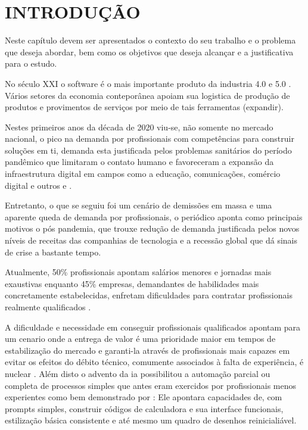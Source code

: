 


\section{\textbf{INTRODUÇÃO}}
    \label{sec:introdução}
    Neste capítulo devem ser apresentados o contexto do seu trabalho e o problema que
    deseja abordar, bem como os objetivos que deseja alcançar e a justificativa para o estudo.
    
    No século XXI o software é o mais importante produto da industria 4.0 e 5.0 .
    Vários setores da economia conteporânea apoiam sua logistica de produção de produtos e 
    provimentos de serviços por meio de tais ferramentas (expandir).

    Nestes primeiros anos da década de 2020 viu-se, não somente no
    mercado nacional, o pico na demanda por profissionais com
    competências para construir soluções em \ac{ti}, demanda esta justificada pelos
    problemas sanitários do período pandêmico que limitaram o contato humano e favoreceram a expansão
    da infraestrutura digital em campos como a educação, comunicações,
    comércio digital e outros \cite{vieira2024impactos} e \cite{carreira2023}.
    
    Entretanto, o que se seguiu foi um cenário de demissões em massa e uma aparente
    queda de demanda por profissionais, o periódico   aponta
    como principais motivos o pós pandemia, que trouxe redução de demanda justificada
    pelos novos níveis de receitas das companhias de tecnologia e a recessão global
    que dá sinais de crise a bastante tempo.

    Atualmente, 50\% profissionais apontam salários menores e
    jornadas mais exaustivas enquanto 45\% empresas, demandantes de habilidades mais
    concretamente estabelecidas, enfretam dificuldades para contratar profissionais
    realmente qualificados \cite{cnn2024}.

    A dificuldade e necessidade em conseguir profissionais qualificados apontam para
    um cenario onde a entrega de valor é uma prioridade maior em tempos de
    estabilização do mercado e garanti-la através de profissionais mais capazes
    em evitar os efeitos do débito técnico, comumente associados à falta de experiência,
    é nuclear \cite[p.~131 et all.]{beltrao2020}. Além disto o advento da \ac{ia} possibilitou a automação parcial ou
    completa de processos simples que antes eram exercidos por profissionais menos
    experientes como bem demonstrado por : Ele
    apontara capacidades de, com prompts simples, construir códigos de calculadora
    e sua interface funcionais, estilização básica consistente e até mesmo um quadro de desenhos
    reinicialiável.

